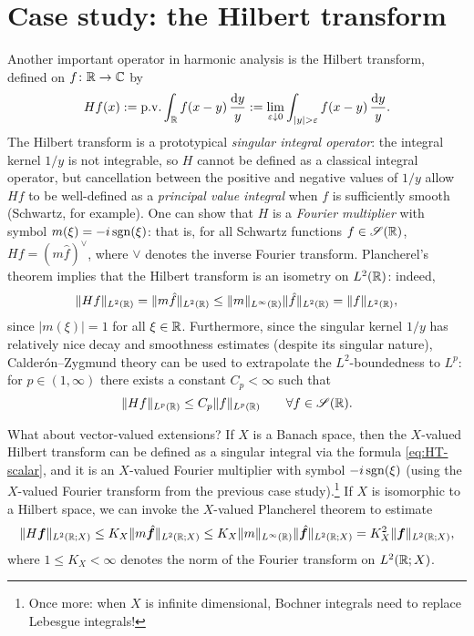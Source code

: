 \section{Case study: the Hilbert transform}

Another important operator in harmonic analysis is the Hilbert transform, defined on $f \colon \mathbb{R} \rightarrow \mathbb{C}$ by
\begin{equation}\label{eq:HT-scalar}
  Hf(x) := \mathrm{p. v.} \int_{\mathbb{R}} f(x-y) \, \frac{\mathrm{d} y}{y} := \lim_{\varepsilon \downarrow 0} \int_{|y| > \varepsilon} f(x-y) \, \frac{\mathrm{d} y}{y}.
\end{equation}
The Hilbert transform is a prototypical \emph{singular integral operator}: the integral kernel $1/y$ is not integrable, so $H$ cannot be defined as a classical integral operator, but cancellation between the positive and negative values of $1/y$ allow $Hf$ to be well-defined as a \emph{principal value integral} when $f$ is sufficiently smooth (Schwartz, for example).
One can show that $H$ is a \emph{Fourier multiplier} with symbol $m(\xi) = -i\operatorname{sgn}(\xi)$: that is, for all Schwartz functions $f \in \mathscr{S}(\mathbb{R})$, $Hf = (m\hat{f})^{\vee}$, where $\vee$ denotes the inverse Fourier transform.
Plancherel's theorem implies that the Hilbert transform is an isometry on $L^2(\mathbb{R})$: indeed,
\begin{equation*}
  \|Hf\|_{L^2(\mathbb{R})} = \|m\hat{f}\|_{L^2(\mathbb{R})} \leq \|m\|_{L^\infty(\mathbb{R})} \|\hat{f}\|_{L^2(\mathbb{R})} = \|f\|_{L^{2}(\mathbb{R})},
\end{equation*}
since $|m(\xi)| = 1$ for all $\xi \in \mathbb{R}$.
Furthermore, since the singular kernel $1/y$ has relatively nice decay and smoothness estimates (despite its singular nature), Calder\'on--Zygmund theory can be used to extrapolate the $L^2$-boundedness to $L^p$: for $p \in (1,\infty)$ there exists a constant $C_{p} < \infty$ such that
\begin{equation*}
  \|Hf\|_{L^p(\mathbb{R})} \leq C_{p} \|f\|_{L^p(\mathbb{R})} \qquad \forall f \in \mathscr{S}(\mathbb{R}).
\end{equation*}

What about vector-valued extensions?
If $X$ is a Banach space, then the $X$-valued Hilbert transform can be defined as a singular integral via the formula \eqref{eq:HT-scalar}, and it is an $X$-valued Fourier multiplier with symbol $-i\operatorname{sgn}(\xi)$ (using the $X$-valued Fourier transform from the previous case study).\footnote{Once more: when $X$ is infinite dimensional, Bochner integrals need to replace Lebesgue integrals!}
If $X$ is isomorphic to a Hilbert space, we can invoke the $X$-valued Plancherel theorem to estimate
\begin{equation*}
  \|H\bm{f}\|_{L^2(\mathbb{R};X)} \leq K_{X} \|m\hat{\bm{f}}\|_{L^2(\mathbb{R};X)} \leq K_{X} \|m\|_{L^\infty(\mathbb{R})} \|\hat{\bm{f}}\|_{L^2(\mathbb{R};X)}= K_{X}^{2} \|\bm{f}\|_{L^{2}(\mathbb{R};X)},
\end{equation*}
where $1 \leq K_{X} < \infty$ denotes the norm of the Fourier transform on $L^2(\mathbb{R};X)$.

